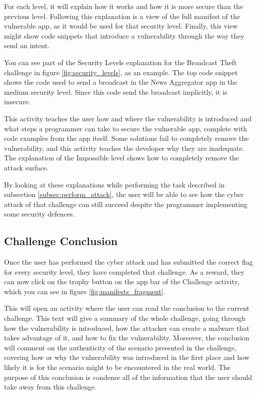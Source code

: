     For each level, it will explain how it works and how it is more secure than the previous level. Following this explanation is a view of the full manifest of the vulnerable app, as it would be used for that security level. Finally, this view might show code snippets that introduce a vulnerability through the way they send an intent.
        
    You can see part of the Security Levels explanation for the Broadcast Theft challenge in figure \ref{fig:security_levels}, as an example. The top code snippet shows the code used to send a broadcast in the News Aggregator app in the medium security level. Since this code send the broadcast implicitly, it is insecure.
    
    This activity teaches the user how and where the vulnerability is introduced and what steps a programmer can take to secure the vulnerable app, complete with code examples from the app itself. Some solutions fail to completely remove the vulnerability, and this activity teaches the developer why they are inadequate. The explanation of the Impossible level shows how to completely remove the attack surface.
    
    By looking at these explanations while performing the task described in subsection \ref{subsec:perform_attack}, the user will be able to see how the cyber attack of that challenge can still succeed despite the programmer implementing some security defences.
    
    \subsection{Challenge Conclusion}
        \label{subsec:challenge_conclusion}
    
    Once the user has performed the cyber attack and has submitted the correct flag for every security level, they have completed that challenge. As a reward, they can now click on the trophy button on the app bar of the Challenge activity, which you can see in figure \ref{fig:manifests_fragment}.
    
    This will open an activity where the user can read the conclusion to the current challenge. This text will give a summary of the whole challenge, going through how the vulnerability is introduced, how the attacker can create a malware that takes advantage of it, and how to fix the vulnerability. Moreover, the conclusion will comment on the authenticity of the scenario presented in the challenge, covering how or why the vulnerability was introduced in the first place and how likely it is for the scenario might to be encountered in the real world. The purpose of this conclusion is condense all of the information that the user should take away from this challenge.
    
